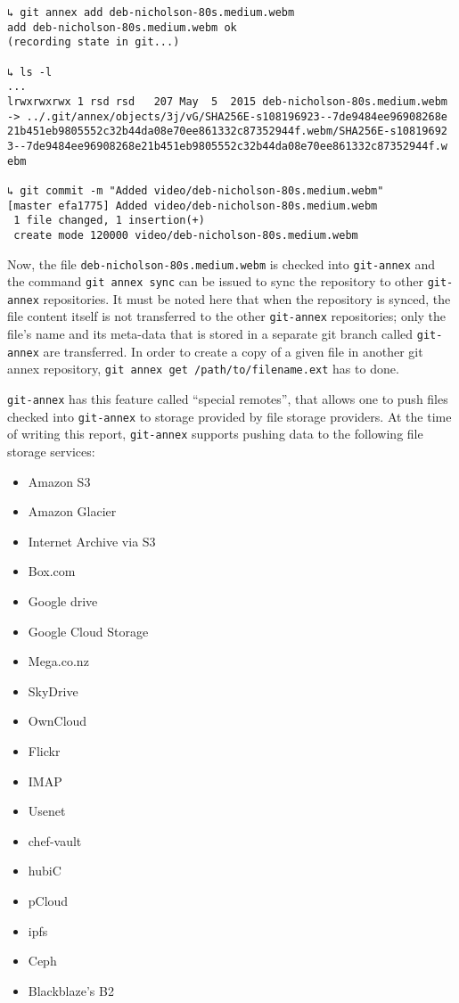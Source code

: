 {\small
\begin{verbatim}
↳ git annex add deb-nicholson-80s.medium.webm
add deb-nicholson-80s.medium.webm ok
(recording state in git...)

↳ ls -l
...
lrwxrwxrwx 1 rsd rsd   207 May  5  2015 deb-nicholson-80s.medium.webm 
-> ../.git/annex/objects/3j/vG/SHA256E-s108196923--7de9484ee96908268e
21b451eb9805552c32b44da08e70ee861332c87352944f.webm/SHA256E-s10819692
3--7de9484ee96908268e21b451eb9805552c32b44da08e70ee861332c87352944f.w
ebm

↳ git commit -m "Added video/deb-nicholson-80s.medium.webm"
[master efa1775] Added video/deb-nicholson-80s.medium.webm
 1 file changed, 1 insertion(+)
 create mode 120000 video/deb-nicholson-80s.medium.webm
\end{verbatim}
}

Now, the file \verb+deb-nicholson-80s.medium.webm+ is checked into
\verb+git-annex+ and the command \verb+git annex sync+ can be issued to sync the
repository to other \verb+git-annex+ repositories. It must be noted
here that when the repository is synced, the file content itself is
not transferred to the other \verb+git-annex+ repositories; only the
file's name and its meta-data that is stored in a separate git branch
called \verb+git-annex+ are
transferred\cite{documentation:git-annex-hworks}. In order to create a
copy of a given file in another git annex repository,
\verb+git annex get /path/to/filename.ext+ has to done.

\verb+git-annex+ has this feature called ``special
remotes''\cite{documentation:git-annex-sremotes}, that allows one to
push files checked into \verb+git-annex+ to storage provided by file
storage providers. At the time of writing this report,
\verb+git-annex+ supports pushing data to the following file storage
services:

{\scriptsize
\begin{itemize}
\item Amazon S3
\item Amazon Glacier
\item Internet Archive via S3
\item Box.com
\item Google drive
\item Google Cloud Storage
\item Mega.co.nz
\item SkyDrive
\item OwnCloud
\item Flickr
\item IMAP
\item Usenet
\item chef-vault
\item hubiC
\item pCloud
\item ipfs
\item Ceph
\item Blackblaze's B2
\end{itemize}
}

